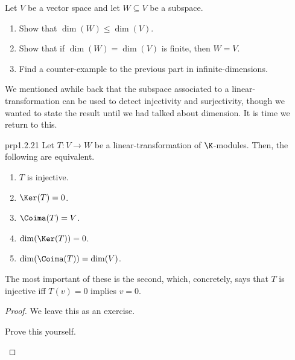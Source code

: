 \begin{exr}{}{}
	Let $V$ be a vector space and let $W\subseteq V$ be a subspace.
	\begin{enumerate}
		\item Show that $\dim (W)\leq \dim (V)$.
		\item Show that if $\dim (W)=\dim (V)$ is finite, then $W=V$.
		\item Find a counter-example to the previous part in infinite-dimensions.
	\end{enumerate}
\end{exr}

We mentioned awhile back that the subspace associated to a linear-transformation can be used to detect injectivity and surjectivity, though we wanted to state the result until we had talked about dimension.  It is time we return to this.
\begin{prp}{}{prp1.2.21}
	Let $T\colon V\rightarrow W$ be a linear-transformation of $\K$-modules.  Then, the following are equivalent.
	\begin{enumerate}
		\item $T$ is injective.
		\item $\Ker (T)=0$.
		\item $\Coima (T)=V$.
		\item $\dim (\Ker (T))=0$.
		\item $\dim (\Coima (T))=\dim (V)$.
	\end{enumerate}
	\begin{rmk}
		The most important of these is the second, which, concretely, says that $T$ is injective iff $T(v)=0$ implies $v=0$.
	\end{rmk}
	\begin{proof}
		We leave this as an exercise.
		\begin{exr}[breakable=false]{}{}
			Prove this yourself.
		\end{exr}
	\end{proof}
\end{prp}
